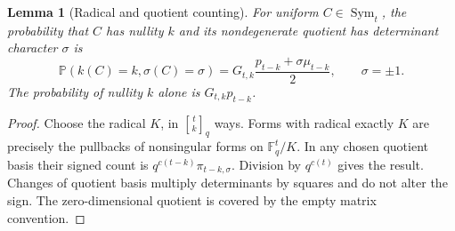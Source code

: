 \documentclass[11pt,a4paper]{article}
\newtheorem{lemma}[theorem]{Lemma}
\theoremstyle{definition}
\theoremstyle{remark}
\newcommand{\F}{\mathbb F}
\newcommand{\Pp}{\mathbb P}
\newcommand{\Sym}{\operatorname{Sym}}
\newcommand{\gb}[2]{\genfrac{[}{]}{0pt}{}{#1}{#2}_{q}}
\begin{document}
\begin{lemma}[Radical and quotient counting]\label{lem:radical}
For uniform $C\in\Sym_t$, the probability that $C$ has nullity $k$ and its
nondegenerate quotient has determinant character $\sigma$ is
\begin{equation}\label{eq:radical-type}
 \Pp(k(C)=k,\sigma(C)=\sigma)
 =G_{t,k}\frac{p_{t-k}+\sigma\mu_{t-k}}2,\qquad \sigma=\pm1.
\end{equation}
The probability of nullity $k$ alone is $G_{t,k}p_{t-k}$.
\end{lemma}
\begin{proof}
Choose the radical $K$, in $\gb tk$ ways. Forms with radical exactly $K$
are precisely the pullbacks of nonsingular forms on $\F_q^t/K$.
In any chosen quotient basis their signed count is
$q^{c(t-k)}\pi_{t-k,\sigma}$. Division by $q^{c(t)}$ gives the result.
Changes of quotient basis multiply determinants by squares and do not
alter the sign. The zero-dimensional quotient is covered by the empty
matrix convention.
\end{proof}
\end{document}
